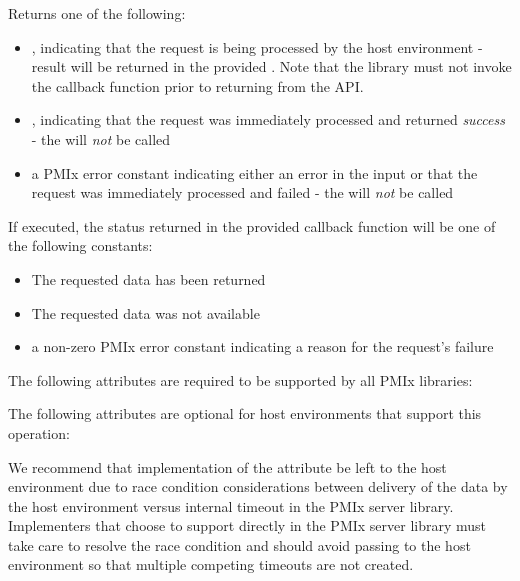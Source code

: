 Returns one of the following:

\begin{itemize}
    \item {}, indicating that the request is being processed by the host environment - result will be returned in the provided . Note that the library must not invoke the callback function prior to returning from the \ac{API}.
    \item {}, indicating that the request was immediately processed and returned \textit{success} - the  will \textit{not} be called
    \item a PMIx error constant indicating either an error in the input or that the request was immediately processed and failed - the  will \textit{not} be called
\end{itemize}

If executed, the status returned in the provided callback function will be one of the following constants:

\begin{itemize}
\item {} The requested data has been returned
\item {} The requested data was not available
\item a non-zero \ac{PMIx} error constant indicating a reason for the request's failure
\end{itemize}

\reqattrstart
The following attributes are required to be supported by all \ac{PMIx} libraries:


\reqattrend

\optattrstart
The following attributes are optional for host environments that support this operation:


\optattrend

\adviceimplstart
We recommend that implementation of the  attribute be left to the host environment due to race condition considerations between delivery of the data by the host environment versus internal timeout in the \ac{PMIx} server library. Implementers that choose to support  directly in the \ac{PMIx} server library must take care to resolve the race condition and should avoid passing  to the host environment so that multiple competing timeouts are not created.
\adviceimplend

